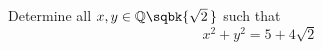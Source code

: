 Determine all $x, y \in \mathbb{Q}\sqbk{\sqrt{2} \,}$ such that
\begin{equation*}
  x^2 + y^2 = 5 + 4 \sqrt{2}
\end{equation*}
